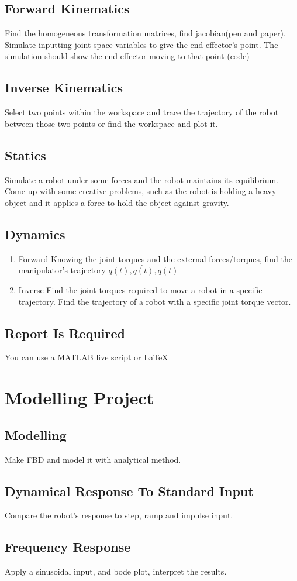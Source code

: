 \documentclass[11pt]{report}
\begin{document}
\section{Forward Kinematics}
\label{sec:orgbc0eb69}
Find the homogeneous transformation matrices, find jacobian(pen and paper). Simulate inputting joint space variables to give the end effector's point. The simulation should show the end effector moving to that point (code)
\section{Inverse Kinematics}
\label{sec:orgfdc2cb1}
Select two points within the workspace and trace the trajectory of the robot between those two points or find the workspace and plot it.
\section{Statics}
\label{sec:orga7308dc}
Simulate a robot under some forces and the robot maintains its equilibrium. Come up with some creative problems, such as the robot is holding a heavy object and it applies a force to hold the object against gravity.
\section{Dynamics}
\label{sec:orgcab135b}
\begin{enumerate}
\item Forward
\label{sec:org1c360ec}
Knowing the joint torques and the external forces/torques, find the manipulator's trajectory \(q(t),\dot{q(t)}, \ddot{q(t)}\)
\item Inverse
\label{sec:org41a8680}
Find the joint torques required to move a robot in a specific trajectory. Find the trajectory of a robot with a specific joint torque vector.
\end{enumerate}
\section{Report Is Required}
\label{sec:org193f7aa}
You can use a MATLAB live script or \LaTeX{}
\chapter{Modelling Project}
\label{sec:org7d1246f}
\section{Modelling}
\label{sec:org8aaf0e1}
Make FBD and model it with analytical method.
\section{Dynamical Response To Standard Input}
\label{sec:org4eae4b3}
Compare the robot's response to step, ramp and impulse input.
\section{Frequency Response}
\label{sec:org473364e}
Apply a sinusoidal input, and bode plot, interpret the results.
\end{document}
